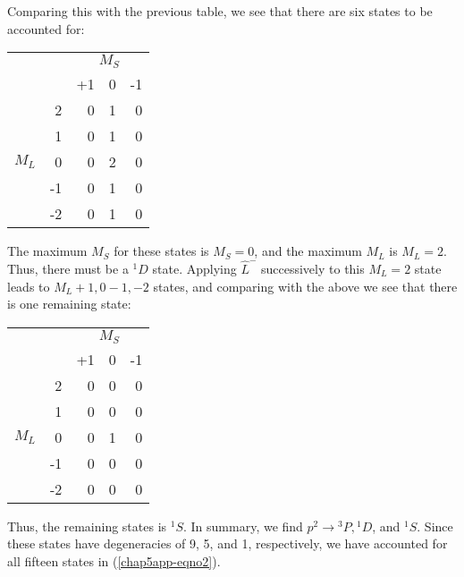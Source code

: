 Comparing this with the previous table, we see
that there are six states to be accounted for:
\begin{center}
\begin{tabular}{rrrrr}\\
&&\multicolumn{3}{c}{$M_S$} \\ 
&&+1 & 0 & -1 \\ \cline{3-5}
& 2 & 0 & 1 & 0 \\
& 1 & 0 & 1 & 0 \\
$M_L$ & 0 & 0 & 2 & 0 \\
& -1 & 0 & 1 & 0 \\
& -2 & 0 & 1 & 0 \\\cline{3-5}
\end{tabular}
\end{center}
The maximum $M_S$ for these states is $M_S =
0$, and the maximum $M_L$ is $M_L = 2$.  Thus, there must be a ${^1D}$
state.  Applying ${\hat L}^-$ successively to this $M_L = 2$ state
leads to $M_L + 1, 0 -1 , -2$ states, and comparing with
the above we see that there is one remaining state:
\begin{center}
\begin{tabular}{rrrrr}\\
&&\multicolumn{3}{c}{$M_S$} \\ 
&&+1 & 0 & -1 \\ \cline{3-5}
& 2 & 0 & 0 & 0 \\
& 1 & 0 & 0 & 0 \\
$M_L$ & 0 & 0 & 1 & 0 \\
& -1 & 0 & 0 & 0 \\
& -2 & 0 & 0 & 0 \\\cline{3-5}
\end{tabular}
\end{center}
Thus, the remaining states is ${^1S}$.  In
summary, we find $p^2 \rightarrow {^3P}, {^1D}$, and ${^1S}$.  Since
these states have degeneracies of 9, 5, and 1, respectively, we have
accounted for all fifteen states in (\ref{chap5app-eqno2}).

